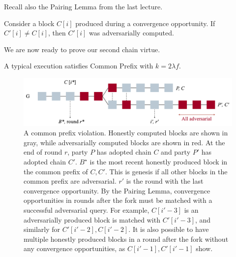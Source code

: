 Recall also the Pairing Lemma from the last lecture.

\begin{lemma}

Consider a block $C[i]$ produced during a convergence opportunity. If $C'[i] \neq C[i]$, then $C'[i]$ was adversarially computed.
\end{lemma}

We are now ready to prove our second chain virtue.

\begin{theorem}
A typical execution satisfies Common Prefix with $k = 2\lambda f$.
\end{theorem}

\begin{figure}
    \centering
    \includegraphics[width=16cm]{figures/common_prefix.png}
    \caption{A common prefix violation. Honestly computed blocks are shown in gray, while adversarially computed blocks are shown in red. At the end of round $r$, party $P$ has adopted chain $C$ and party $P'$ has adopted chain $C'$. $B^\star$ is the most recent honestly produced block in the common prefix of $C,C'$. This is genesis if all other blocks in the common prefix are adversarial. $r'$ is the round with the last convergence opportunity. By the Pairing Lemma, convergence opportunities in rounds after the fork must be matched with a successful adversarial query. For example, $C[i'-3]$ is an adversarially produced block is matched with $C'[i'-3]$, and similarly for $C'[i'-2], C[i'-2]$. It is also possible to have multiple honestly produced blocks in a round after the fork without any convergence opportunities, as $C[i'-1], C'[i'-1]$ show.}
    \label{fig:cp_violation}
\end{figure}

